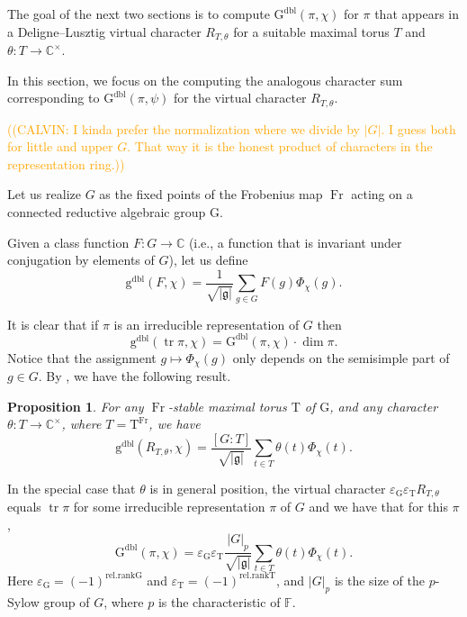 \documentclass[12pt, reqno]{amsart}
\newtheorem{proposition}[theorem]{Proposition}
\theoremstyle{definition}
\theoremstyle{definition}
\theoremstyle{definition}
\newcommand{\cComplex}{\mathbb{C}}
\newcommand{\multiplicativegroup}[1]{#1^{\times}}
\newcommand{\sizeof}[1]{\left|#1\right|}
\newcommand{\fieldCharacter}{\psi}
\newcommand{\grpIndex}[2]{\left[#1:#2\right]}
\newcommand{\trace}{\operatorname{tr}}
\newcommand{\finiteField}{\mathbb{F}}
\newcommand{\Frobenius}{\operatorname{Fr}}
\newcommand{\dblGaussSumScalar}[2]{\mathrm{G}^{\mathrm{dbl}}\left(#1, #2\right)}
\newcommand{\dblVirtualGaussSumScalar}[2]{\mathrm{g}^{\mathrm{dbl}}\left(#1, #2\right)}
\newcommand{\lieAlgebra}{\mathfrak{g}}
\newcommand{\algebraicGroup}[1]{\boldsymbol{\mathrm{#1}}}
\newcommand{\calvin}[1]{\textcolor{orange}{\sffamily ((CALVIN: #1))}}
\begin{document}
The goal of the next two sections is to compute $\dblGaussSumScalar{\pi}{\chi}$ for $\pi$ that appears in a Deligne--Lusztig virtual character $R_{T,\theta}$ for a suitable maximal torus $T$ and $\theta \colon T \to \multiplicativegroup{\cComplex}$.

In this section, we focus on the computing the analogous character sum corresponding to $\dblGaussSumScalar{\pi}{\fieldCharacter}$ for the virtual character $R_{T,\theta}$.

\calvin{I kinda prefer the normalization where we divide by $|G|$. I guess both for little and upper $G$. That way it is the honest product of characters in the representation ring.}

Let us realize $G$ as the fixed points of the Frobenius map $\Frobenius$ acting on a connected reductive algebraic group $\algebraicGroup{G}$.

Given a class function $F \colon G \to \cComplex$ (i.e., a function that is invariant under conjugation by elements of $G$), let us define $$\dblVirtualGaussSumScalar{F}{\chi} = \frac{1}{\sqrt{\sizeof{\lieAlgebra}}} \sum_{g \in G} F\left(g\right) \Phi_{\chi}\left(g\right).$$

It is clear that if $\pi$ is an irreducible representation of $G$ then $$\dblVirtualGaussSumScalar{\trace \pi}{\chi} = \dblGaussSumScalar{\pi}{\chi} \cdot \dim \pi.$$
Notice that the assignment $g \mapsto \Phi_{\chi}\left(g\right)$ only depends on the semisimple part of $g \in G$. By \cite[Theorem in Section 1.2]{SaitoShinoda2000}, we have the following result.
\begin{proposition}\label{prop:reduction-of-gauss-sum-to-torus}
	For any $\Frobenius$-stable maximal torus $\algebraicGroup{T}$ of $\algebraicGroup{G}$, and any character $\theta \colon T \to \multiplicativegroup{\cComplex}$, where $T = \algebraicGroup{T}^{\Frobenius}$, we have
	$$ \dblVirtualGaussSumScalar{R_{T, \theta}}{\chi} = \frac{\grpIndex{G}{T}}{\sqrt{\sizeof{\lieAlgebra}}} \sum_{t \in T} \theta\left(t\right) \Phi_{\chi}\left(t\right).$$
\end{proposition}
In the special case that $\theta$ is in general position, the virtual character $\varepsilon_{\algebraicGroup{G}} \varepsilon_{\algebraicGroup{T}} R_{T, \theta}$ equals $\trace \pi$ for some irreducible representation $\pi$ of $G$ and we have that for this $\pi$,
$$\dblGaussSumScalar{\pi}{\chi} = \varepsilon_{\algebraicGroup{G}} \varepsilon_{\algebraicGroup{T}} \frac{\sizeof{G}_p}{\sqrt{\sizeof{\lieAlgebra}}} \sum_{t \in T} \theta\left(t\right) \Phi_{\chi}\left(t\right).$$
Here $\varepsilon_{\algebraicGroup{G}} = \left(-1\right)^{\mathrm{rel.rank} \algebraicGroup{G}}$ and $\varepsilon_{\algebraicGroup{T}} = \left(-1\right)^{\mathrm{rel.rank} \algebraicGroup{T}}$, and $\sizeof{G}_p$ is the size of the $p$-Sylow group of $G$, where $p$ is the characteristic of $\finiteField$. 
\end{document}

